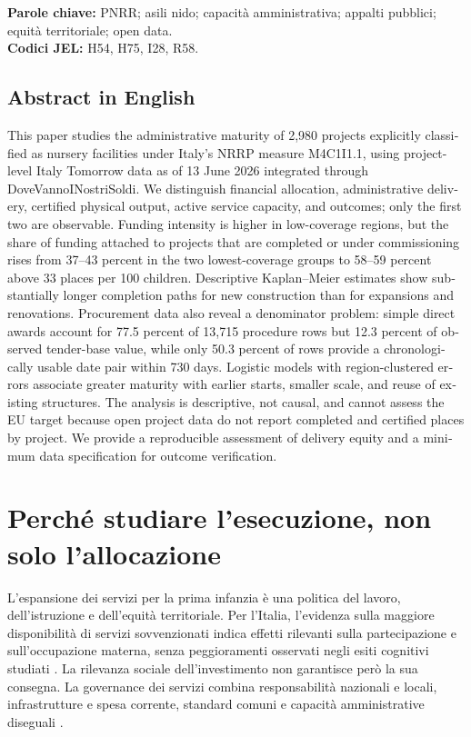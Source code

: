 \documentclass[10pt,a4paper]{article}
\begin{document}
\textbf{Parole chiave:} PNRR; asili nido; capacità amministrativa; appalti pubblici; equità territoriale; open data.\\
\textbf{Codici JEL:} H54, H75, I28, R58.

\begin{otherlanguage}{english}
\section*{Abstract in English}
This paper studies the administrative maturity of 2,980 projects explicitly classified as nursery facilities under Italy's NRRP measure M4C1I1.1, using project-level Italy Tomorrow data as of 13 June 2026 integrated through DoveVannoINostriSoldi. We distinguish financial allocation, administrative delivery, certified physical output, active service capacity, and outcomes; only the first two are observable. Funding intensity is higher in low-coverage regions, but the share of funding attached to projects that are completed or under commissioning rises from 37--43 percent in the two lowest-coverage groups to 58--59 percent above 33 places per 100 children. Descriptive Kaplan--Meier estimates show substantially longer completion paths for new construction than for expansions and renovations. Procurement data also reveal a denominator problem: simple direct awards account for 77.5 percent of 13,715 procedure rows but 12.3 percent of observed tender-base value, while only 50.3 percent of rows provide a chronologically usable date pair within 730 days. Logistic models with region-clustered errors associate greater maturity with earlier starts, smaller scale, and reuse of existing structures. The analysis is descriptive, not causal, and cannot assess the EU target because open project data do not report completed and certified places by project. We provide a reproducible assessment of delivery equity and a minimum data specification for outcome verification.
\end{otherlanguage}

\section{Perché studiare l'esecuzione, non solo l'allocazione}

L'espansione dei servizi per la prima infanzia è una politica del lavoro, dell'istruzione e dell'equità territoriale. Per l'Italia, l'evidenza sulla maggiore disponibilità di servizi sovvenzionati indica effetti rilevanti sulla partecipazione e sull'occupazione materna, senza peggioramenti osservati negli esiti cognitivi studiati \citep{carta2018}. La rilevanza sociale dell'investimento non garantisce però la sua consegna. La governance dei servizi combina responsabilità nazionali e locali, infrastrutture e spesa corrente, standard comuni e capacità amministrative diseguali \citep{lippi2023,torrini2025}.
\end{document}

